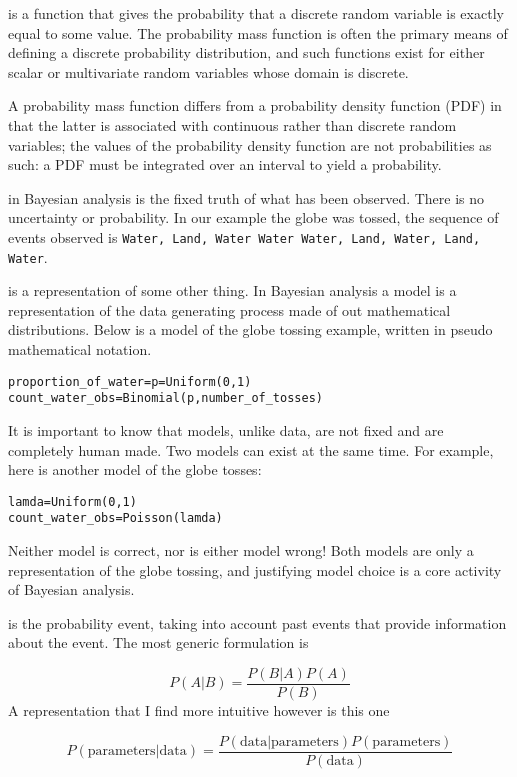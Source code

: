  is a function that gives the probability that a discrete random variable is exactly equal to some value. The probability mass function is often the primary means of defining a discrete probability distribution, and such functions exist for either scalar or multivariate random variables whose domain is discrete.

A probability mass function differs from a probability density function (PDF) in that the latter is associated with continuous rather than discrete random variables; the values of the probability density function are not probabilities as such: a PDF must be integrated over an interval to yield a probability.

 in Bayesian analysis is the fixed truth of what has been observed. There is no uncertainty or probability. In our example the globe was tossed, the sequence of events observed is \lstinline{Water, Land, Water Water Water, Land, Water, Land, Water}.

 is a representation of some other thing.  In Bayesian analysis a model is a representation of the data generating process made of out mathematical distributions. Below is a model of the globe tossing example, written in pseudo mathematical notation.

\begin{lstlisting}
proportion_of_water=p=Uniform(0,1)
count_water_obs=Binomial(p,number_of_tosses)
\end{lstlisting}
It is important to know that models, unlike data, are not fixed and are completely human made. Two models can exist at the same time. For example, here is another model of the globe tosses:
\begin{lstlisting}
lamda=Uniform(0,1)
count_water_obs=Poisson(lamda)
\end{lstlisting}
Neither model is correct, nor is either model wrong! Both models are only a representation of the globe tossing, and justifying model choice is a core activity of Bayesian analysis.

 is the probability event, taking into account past events that provide information about the event. The most generic formulation is 

\begin{equation}
P(A|B) = \frac{P(B|A)P(A)}{P(B)}
\end{equation}
A representation that I find more intuitive however is this one 

\begin{equation}
    P(\textrm{parameters}|\textrm{data}) = 
    \frac{P(\textrm{data}|\textrm{parameters})P(\textrm{parameters})} {P(\textrm{data})}
\end{equation}

